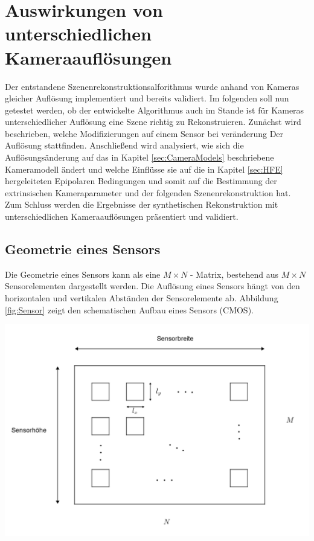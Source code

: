 \chapter{Auswirkungen von unterschiedlichen Kameraauflösungen}
\label{sec:minimalAuf} 

Der entstandene Szenenrekonstruktionsalforithmus wurde anhand von Kameras gleicher Auflösung implementiert und bereits validiert. Im folgenden soll nun getestet werden, ob der entwickelte Algorithmus auch im Stande ist für Kameras unterschiedlicher Auflösung eine Szene richtig zu Rekonstruieren. Zunächst wird beschrieben, welche Modifizierungen auf einem Sensor bei veränderung Der Auflösung stattfinden. Anschließend wird analysiert, wie sich die Auflösungsänderung auf das in Kapitel \ref{sec:CameraModels} beschriebene Kameramodell ändert und welche Einflüsse sie auf die in Kapitel \ref{sec:HFE} hergeleiteten Epipolaren Bedingungen und somit auf die Bestimmung der extrinsischen Kameraparameter und der folgenden Szenenrekonstruktion hat. Zum Schluss werden die Ergebnisse der synthetischen Rekonstruktion mit unterschiedlichen Kameraauflösungen präsentiert und validiert.
 

\section{Geometrie eines Sensors}


Die Geometrie eines Sensors kann als eine  $M \times N$ - Matrix, bestehend aus $M \times N$ Sensorelementen dargestellt werden\cite{Photonik}. Die Auflösung eines Sensors hängt von den horizontalen und vertikalen Abständen der Sensorelemente ab. Abbildung \ref{fig:Sensor} zeigt den schematischen Aufbau eines Sensors (CMOS). 

\begin{minipage}{\linewidth}
	\centering
	\includegraphics[width=.8\linewidth]{images/Bildsensor_mit_Pixel.png}
	\label{fig:Sensor}
\end{minipage}\\\\


